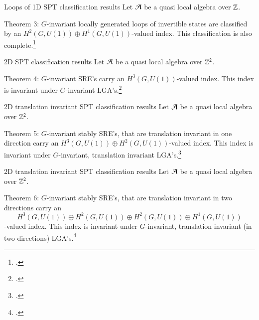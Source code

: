 \documentclass{beamer}
\begin{document}
\begin{frame}{Loops of 1D SPT classification results}
Let $\AA$ be a quasi local algebra over $\ZZ$.
\begin{block}{Theorem 3:}
$G$-invariant locally generated loops of invertible states are classified by an $H^2(G,U(1))\oplus H^1(G,U(1))$-valued index. This classification is also complete.\footcite{https://doi.org/10.48550/arxiv.2204.03763}
\end{block}
\end{frame}

\begin{frame}{2D SPT classification results}
Let $\AA$ be a quasi local algebra over $\ZZ^2$.
\begin{block}{Theorem 4:}
$G$-invariant SRE's carry an $H^3(G,U(1))$-valued index. This index is invariant under $G$-invariant LGA's.\footcite{ogata2021h3gmathbb}
\end{block}
\end{frame}

\begin{frame}{2D translation invariant SPT classification results}
Let $\AA$ be a quasi local algebra over $\ZZ^2$.
\begin{block}{Theorem 5:}
$G$-invariant stably SRE's, that are translation invariant in one direction carry an $H^3(G,U(1))\oplus H^2(G,U(1))$-valued index. This index is invariant under $G$-invariant, translation invariant LGA's.\footcite{https://doi.org/10.48550/arxiv.2202.11758}
\end{block}
\end{frame}

\begin{frame}{2D translation invariant SPT classification results}
Let $\AA$ be a quasi local algebra over $\ZZ^2$.
\begin{block}{Theorem 6:}
$G$-invariant stably SRE's, that are translation invariant in two directions carry an
\[H^3(G,U(1))\oplus H^2(G,U(1))\oplus H^2(G,U(1))\oplus H^1(G,U(1))\]
-valued index. This index is invariant under $G$-invariant, translation invariant (in two directions) LGA's.\footcite{https://doi.org/10.48550/arxiv.2202.11758}
\end{block}
\end{frame}
\end{document}
